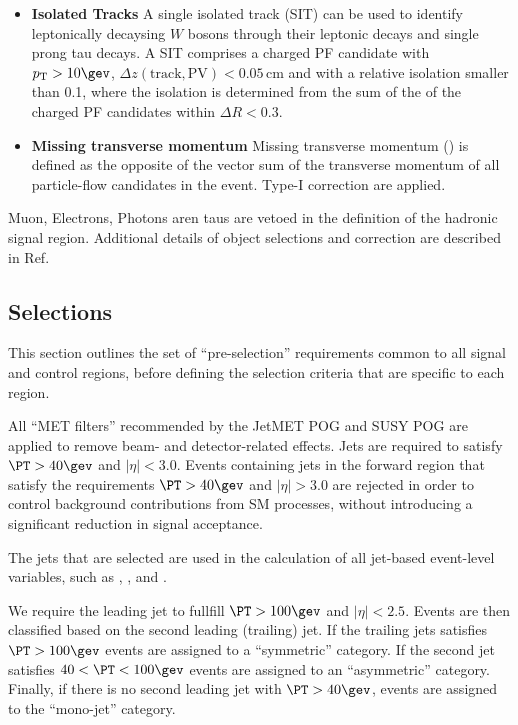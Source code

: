 \begin{itemize}
  \item{\bf Isolated Tracks}  A single isolated track (SIT) can be used to identify leptonically decaysing $W$ bosons through their leptonic decays and single prong tau decays.
    A SIT comprises a charged PF candidate with $\Pt > 10 \gev$, $\Delta z(\mathrm{track}, \mathrm{PV}) < 0.05 \, \mathrm{cm}$  and with a relative isolation smaller than 0.1, where the isolation is determined from the sum of the \Pt of the charged PF candidates within $\Delta R < 0.3$.

 \item{\bf Missing transverse momentum} Missing transverse momentum (\met) is defined as the opposite of the vector sum of the transverse momentum of all particle-flow candidates in the event. Type-I \met correction \cite{Khachatryan:2014gga} are applied.


\end{itemize}


Muon, Electrons, Photons aren taus are vetoed in the definition of the hadronic signal region. Additional details of object selections and correction are described in Ref.~\cite{alphaTnote}

\subsection{Selections}


This section outlines the set of ``pre-selection'' requirements common to all signal and control regions, before defining the selection criteria that are specific to each region. 


All ``MET filters'' recommended by the JetMET POG and SUSY POG are applied to remove beam- and detector-related effects. Jets are required to satisfy $\PT>40\gev$ and $|\eta|<3.0$. Events containing jets in the forward region that satisfy the requirements $\PT>40\gev$ and $|\eta|>3.0$ are rejected in order to control background contributions from SM processes, without introducing a significant reduction in signal acceptance. 

The jets that are selected are used in the calculation of all jet-based event-level variables, such as \HT, \mht, and \alphat.

We require the leading jet to fullfill $\PT > 100\gev$ and $|\eta|<2.5$.  Events are then classified based on the second leading (trailing) jet. 
If the trailing jets satisfies $\PT > 100\gev$  events are assigned to a ``symmetric'' \njet category. If the second
jet satisfies $40 < \PT < 100\gev$ events are assigned to an ``asymmetric'' \njet category. Finally, if there is no second leading
jet with $\PT>40\gev$, events are assigned to the ``mono-jet'' category. 


